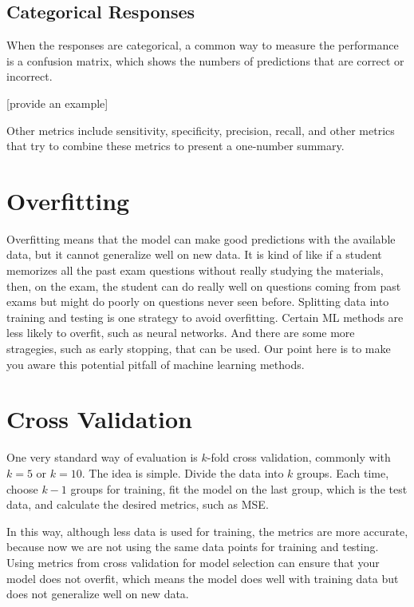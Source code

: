 \documentclass[
]{book}
\begin{document}
\hypertarget{categorical-responses}{%
\subsection{Categorical Responses}\label{categorical-responses}}

When the responses are categorical, a common way to measure the performance is a confusion matrix, which shows the numbers of predictions that are correct or incorrect.

{[}provide an example{]}

Other metrics include sensitivity, specificity, precision, recall, and other metrics that try to combine these metrics to present a one-number summary.

\hypertarget{overfitting}{%
\section{Overfitting}\label{overfitting}}

Overfitting means that the model can make good predictions with the available data, but it cannot generalize well on new data. It is kind of like if a student memorizes all the past exam questions without really studying the materials, then, on the exam, the student can do really well on questions coming from past exams but might do poorly on questions never seen before. Splitting data into training and testing is one strategy to avoid overfitting. Certain ML methods are less likely to overfit, such as neural networks. And there are some more stragegies, such as early stopping, that can be used. Our point here is to make you aware this potential pitfall of machine learning methods.

\hypertarget{cross-validation}{%
\section{Cross Validation}\label{cross-validation}}

One very standard way of evaluation is \(k\)-fold cross validation, commonly with \(k=5\) or \(k=10\). The idea is simple. Divide the data into \(k\) groups. Each time, choose \(k-1\) groups for training, fit the model on the last group, which is the test data, and calculate the desired metrics, such as MSE.

In this way, although less data is used for training, the metrics are more accurate, because now we are not using the same data points for training and testing. Using metrics from cross validation for model selection can ensure that your model does not overfit, which means the model does well with training data but does not generalize well on new data.
\end{document}
